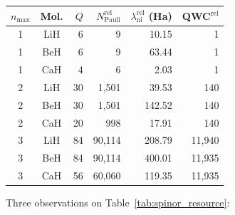 \documentclass[aps,pra,twocolumn,superscriptaddress,longbibliography]{revtex4-2}
\begin{document}
\begin{table}[h]
\begin{ruledtabular}
\begin{tabular}{ccrrrr}
$n_{\max}$ & Mol. & $Q$ & $N_{\mathrm{Pauli}}^{\mathrm{rel}}$ & $\lambda_{\mathrm{ni}}^{\mathrm{rel}}$ (Ha) & QWC$^{\mathrm{rel}}$ \\
\hline
1 & LiH &  6 &        9 &  10.15 &      1 \\
1 & BeH &  6 &        9 &  63.44 &      1 \\
1 & CaH &  4 &        6 &   2.03 &      1 \\
2 & LiH & 30 &  1{,}501 &  39.53 &    140 \\
2 & BeH & 30 &  1{,}501 & 142.52 &    140 \\
2 & CaH & 20 &      998 &  17.91 &    140 \\
3 & LiH & 84 & 90{,}114 & 208.79 & 11{,}940 \\
3 & BeH & 84 & 90{,}114 & 400.01 & 11{,}935 \\
3 & CaH & 56 & 60{,}060 & 119.35 & 11{,}935 \\
\end{tabular}
\end{ruledtabular}
\end{table}

Three observations on Table~\ref{tab:spinor_resource}:
\end{document}
